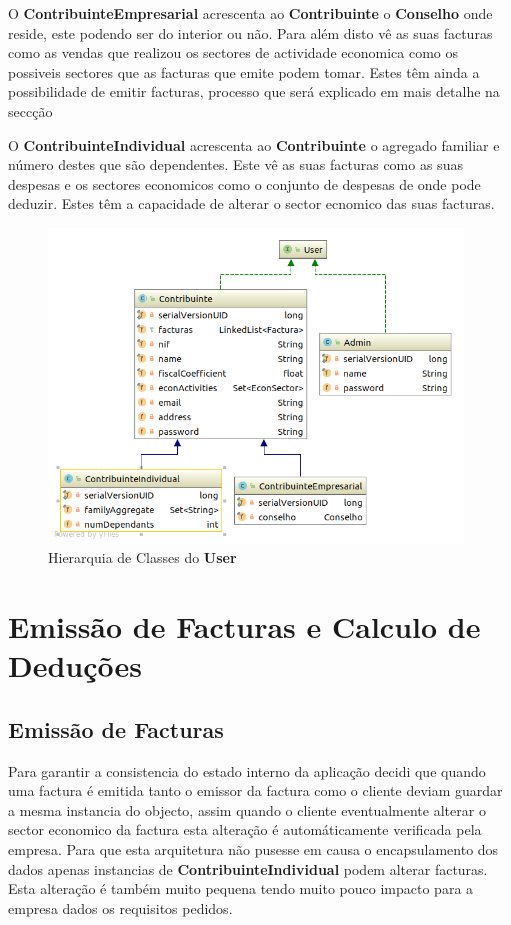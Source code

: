 \documentclass[12pt,a4paper]{report}
\begin{document}
    O \textbf{ContribuinteEmpresarial} acrescenta ao \textbf{Contribuinte}
    o \textbf{Conselho} onde reside, este podendo ser do interior ou não. Para
    além disto vê as suas facturas como as vendas que realizou os sectores de
    actividade economica como os possiveis sectores que as facturas que emite
    podem tomar. Estes têm ainda a possibilidade de emitir facturas, processo
    que será explicado em mais detalhe na seccção %

    O \textbf{ContribuinteIndividual} acrescenta ao \textbf{Contribuinte}
    o agregado familiar e número destes que são dependentes. Este vê as suas
    facturas como as suas despesas e os sectores economicos como o conjunto
    de despesas de onde pode deduzir. Estes têm a capacidade de alterar o
    sector ecnomico das suas facturas.

    \begin{figure}[h]
        \centering
        \includegraphics[width=11cm]{./images/UserHierarquy.png}
        \caption{Hierarquia de Classes do \textbf{User}}\label{fig:Hierarquia}
    \end{figure}

\chapter{Emissão de Facturas e Calculo de Deduções}

\section{Emissão de Facturas}
    Para garantir a consistencia do estado interno da aplicação decidi que
    quando uma factura é emitida tanto o emissor da factura como o cliente
    deviam guardar a mesma instancia do objecto, assim quando o cliente
    eventualmente alterar o sector economico da factura esta alteração é
    automáticamente verificada pela empresa. Para que esta arquitetura não
    pusesse em causa o encapsulamento dos dados apenas instancias de
    \textbf{ContribuinteIndividual} podem alterar facturas. Esta alteração
    é também muito pequena tendo muito pouco impacto para a empresa dados
    os requisitos pedidos.
\end{document}
